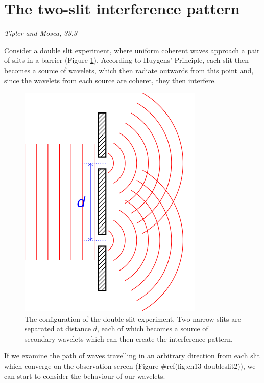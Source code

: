 \documentclass[
]{book}
\begin{document}
\hypertarget{sec:ch13-twoslitinterference}{%
\section{The two-slit interference pattern}\label{sec:ch13-twoslitinterference}}

\emph{Tipler and Mosca, 33.3}

Consider a double slit experiment, where uniform coherent waves approach a pair of slits in a barrier (Figure \ref{fig:ch13-doubleslit1}). According to Huygens' Principle, each slit then becomes a source of wavelets, which then radiate outwards from this point and, since the wavelets from each source are coheret, they then interfere.

\begin{figure}

{\centering \includegraphics[width=0.7\linewidth]{visualisations/LaTeX/ch13-doubleslits} 

}

\caption{The configuration of the double slit experiment. Two narrow slits are separated at distance $d$, each of which becomes a source of secondary wavelets which can then create the interference pattern.}\label{fig:ch13-doubleslit1}
\end{figure}

If we examine the path of waves travelling in an arbitrary direction from each slit which converge on the observation screen (Figure \#ref(fig:ch13-doubleslit2)), we can start to consider the behaviour of our wavelets.
\end{document}
